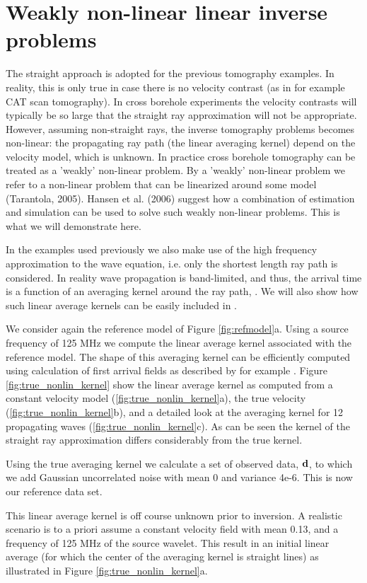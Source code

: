 \documentclass[12t]{article}
\begin{document}
\section{Weakly non-linear linear inverse problems}
The straight approach is adopted for the previous tomography examples. In reality, this is only true in case there is no velocity contrast (as in for example CAT scan tomography). In cross borehole experiments the velocity contrasts will typically be so large that the straight ray approximation will not be appropriate. However, assuming non-straight rays, the inverse tomography problems becomes non-linear: the propagating ray path (the linear averaging kernel) depend on the velocity model, which is unknown.
In practice cross borehole tomography can be treated as a 'weakly' non-linear problem.  By a 'weakly' non-linear problem we refer to a non-linear problem that can be linearized around some model (Tarantola, 2005). Hansen et al. (2006) suggest how a combination of estimation and simulation can be used to solve such weakly non-linear problems. This is what we will demonstrate here.

In the examples used previously we also make use of the high frequency approximation to the wave equation, i.e. only the shortest length ray path is considered. In reality wave propagation is band-limited, and thus, the arrival time is a function of an averaging kernel around the ray path, \cite{Woodward}. 
We will also show how such linear average kernels can be easily included in \visimprog.

We consider again the reference model of Figure  \ref{fig:refmodel}a. Using a source frequency of 125 MHz we compute the linear average kernel associated with the reference model. 
The shape of this averaging kernel can be efficiently computed using calculation of first arrival fields as described by for example \cite{Munk}. 
Figure \ref{fig:true_nonlin_kernel} show the linear average kernel as computed from a 
constant velocity model (\ref{fig:true_nonlin_kernel}a), 
the true velocity (\ref{fig:true_nonlin_kernel}b), and a detailed look at the averaging kernel for 12 propagating waves (\ref{fig:true_nonlin_kernel}c).  As can be seen the kernel of the straight ray approximation differs considerably from the true kernel.

Using the true averaging kernel we calculate a set of observed data, ${\bf d}$, to which we add Gaussian uncorrelated noise with mean 0 and variance 4e-6. This is now our reference data set.

This linear average kernel is off course unknown prior to inversion. A realistic scenario is to a priori assume a constant velocity field with mean 0.13, and a frequency of 125 MHz of the source wavelet. This result in an initial linear average (for which the center of the averaging kernel is straight lines) as illustrated in Figure \ref{fig:true_nonlin_kernel}a.
\end{document}
